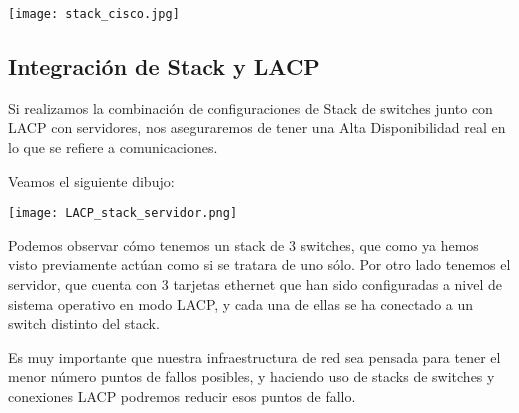 \begin{center}
    \vspace{-10pt}
    \texttt{[image: stack\_cisco.jpg]}
    \vspace{-10pt}
\end{center}


\subsection{Integración de Stack y LACP}
Si realizamos la combinación de configuraciones de Stack de switches junto con LACP con servidores, nos aseguraremos de tener una Alta Disponibilidad real en lo que se refiere a comunicaciones.

Veamos el siguiente dibujo:


\begin{center}
    \vspace{-10pt}
    \texttt{[image: LACP\_stack\_servidor.png]}
    \vspace{-10pt}
\end{center}

Podemos observar cómo tenemos un stack de 3 switches, que como ya hemos visto previamente actúan como si se tratara de uno sólo. Por otro lado tenemos el servidor, que cuenta con 3 tarjetas ethernet que han sido configuradas a nivel de sistema operativo en modo LACP, y cada una de ellas se ha conectado a un switch distinto del stack.


Es muy importante que nuestra infraestructura de red sea pensada para tener el menor número puntos de fallos posibles, y haciendo uso de stacks de switches y conexiones LACP podremos reducir esos puntos de fallo.

